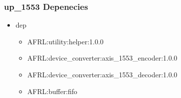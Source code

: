 \subsubsection{up\_1553 Depenecies}
\begin{itemize}
\item dep
	\begin{itemize}
	\item AFRL:utility:helper:1.0.0
	\item AFRL:device\_converter:axis\_1553\_encoder:1.0.0
	\item AFRL:device\_converter:axis\_1553\_decoder:1.0.0
	\item AFRL:buffer:fifo
	\end{itemize}
\end{itemize}

